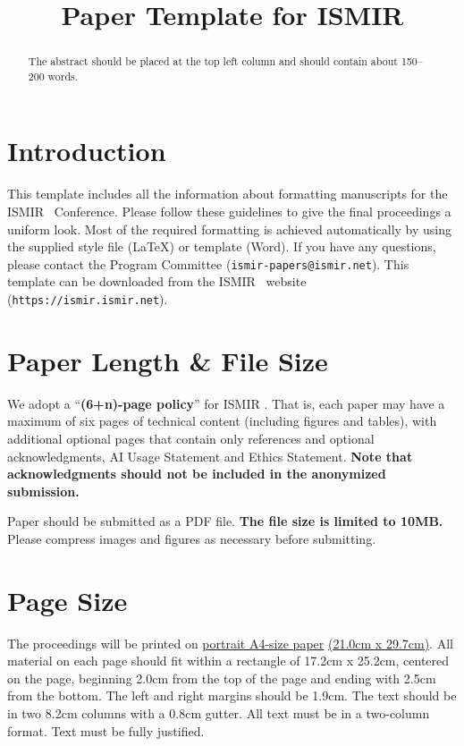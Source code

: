 \documentclass{article}
\title{Paper Template for ISMIR \conferenceyear}
\begin{document}
\maketitle

\begin{abstract}
The abstract should be placed at the top left column and should contain about 150--200 words.
\end{abstract}

\section{Introduction}\label{sec:introduction}

This template includes all the information about formatting manuscripts for the ISMIR \conferenceyear\ Conference. Please follow these guidelines to give the final proceedings a uniform look. Most of the required formatting is achieved automatically by using the supplied style file (\LaTeX) or template (Word). If you have any questions, please contact the Program Committee (\texttt{ismir\conferenceyear-papers@ismir.net}). This template can be downloaded from the ISMIR \conferenceyear\ website (\texttt{https://ismir\conferenceyear.ismir.net}).

\section{Paper Length \& File Size}

We adopt a ``\textbf{(6+n)-page policy}'' for ISMIR \conferenceyear. That is, each paper may have a maximum of six pages of technical content (including figures and tables), with additional optional pages that contain only references and optional acknowledgments, AI Usage Statement and Ethics Statement. \textbf{Note that acknowledgments should not be included in the anonymized submission.}

Paper should be submitted as a PDF file. \textbf{The file size is limited to 10MB.} Please compress images and figures as necessary before submitting.

\section{Page Size}\label{sec:page_size}

The proceedings will be printed on \underline{portrait A4-size paper} \underline{(21.0cm x 29.7cm)}. All material on each page should fit within a rectangle of 17.2cm x 25.2cm, centered on the page, beginning 2.0cm from the top of the page and ending with 2.5cm from the bottom. The left and right margins should be 1.9cm. The text should be in two 8.2cm columns with a 0.8cm gutter. All text must be in a two-column format. Text must be fully justified.
\end{document}
